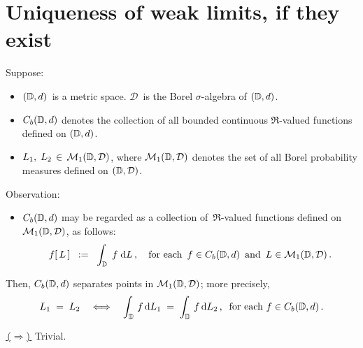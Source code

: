 

\section{Uniqueness of weak limits, if they exist}
\setcounter{theorem}{0}
\setcounter{equation}{0}


\renewcommand{\theenumi}{\roman{enumi}}
\renewcommand{\labelenumi}{\textnormal{(\theenumi)}$\;\;$}


\begin{theorem}
\label{CbSeparatesPointsInM1DD}
\mbox{}\vskip 0.1cm
\noindent
Suppose:
\begin{itemize}
\item
	$(\mathbb{D},d)$\, is a metric space.
	$\mathcal{D}$\, is the Borel $\sigma$-algebra of $(\mathbb{D},d)$.
\item
	$C_{b}(\mathbb{D},d)$ denotes the collection of all bounded continuous $\Re$-valued functions defined on $(\mathbb{D},d)$.
\item
	$L_{1},\; L_{2} \,\in\, \mathcal{M}_{1}(\mathbb{D},\mathcal{D})$,
	where $\mathcal{M}_{1}(\mathbb{D},\mathcal{D})$ denotes the set of
	all Borel probability measures defined on $(\mathbb{D},\mathcal{D})$.
\end{itemize}
Observation:
\begin{itemize}
\item
	$C_{b}(\mathbb{D},d)$ may be regarded as a collection of \,$\Re$-valued functions
	defined on $\mathcal{M}_{1}(\mathbb{D},\mathcal{D})$, as follows:
	\begin{equation*}
	f\!\left[\,L\,\right]
	\;\; := \;\;
		\int_{\mathbb{D}}\; f\;\textnormal{d} L\,,
	\quad
	\textnormal{for each \,$f \in C_{b}(\mathbb{D},d)$\, and \,$L \in \mathcal{M}_{1}(\mathbb{D},\mathcal{D})$}\,.
	\end{equation*}
\end{itemize}
Then, $C_{b}(\mathbb{D},d)$ separates points in $\mathcal{M}_{1}(\mathbb{D},\mathcal{D})$;
more precisely,
\begin{equation*}
L_{1} \; = \; L_{2}
\quad\Longleftrightarrow\quad
	\int_{\mathbb{D}}\, f \,\textnormal{d} L_{1} \;=\; \int_{\mathbb{D}}\, f \,\textnormal{d} L_{2}\,,
	\;\;
	\textnormal{for each $f \in C_{b}(\mathbb{D},d)$}\,.
\end{equation*}
\end{theorem}
\proof
\vskip 0.1cm
\noindent
\underline{\,($\Longrightarrow$)\,}\;\;
Trivial.

